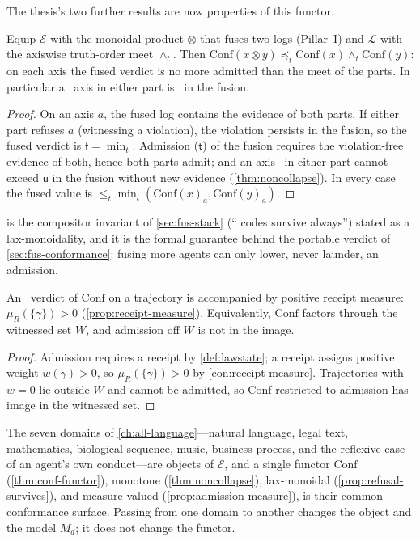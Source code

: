 The thesis's two further results are now properties of this functor.

\begin{proposition}
\label{prop:refusal-survives}
Equip $\mathcal E$ with the monoidal product $\otimes$ that fuses two logs
(Pillar~I) and $\mathcal L$ with the axiswise truth-order meet $\wedge_t$. Then
$\mathrm{Conf}(x\otimes y)\preceq_t\mathrm{Conf}(x)\wedge_t\mathrm{Conf}(y)$: on each
axis the fused verdict is no more admitted than the meet of the parts. In
particular a \ axis in either part is \ in the fusion.
\end{proposition}
\begin{proof}
On an axis $a$, the fused log contains the evidence of both parts. If either part
refuses $a$ (witnessing a violation), the violation persists in the fusion, so the
fused verdict is $\mathsf f=\min_t$. Admission ($\mathsf t$) of the fusion requires
the violation-free evidence of both, hence both parts admit; and an axis
\unknownstat\ in either part cannot exceed $\mathsf u$ in the fusion without new
evidence (\cref{thm:noncollapse}). In every case the fused value is
$\le_t\min_t(\mathrm{Conf}(x)_a,\mathrm{Conf}(y)_a)$.
\end{proof}

 is the compositor invariant of \cref{sec:fus-stack}
(`` codes survive always'') stated as a lax-monoidality, and
it is the formal guarantee behind the portable verdict of
\cref{sec:fus-conformance}: fusing more agents can only lower, never launder, an
admission.

\begin{proposition}
\label{prop:admission-measure}
An \admitted\ verdict of $\mathrm{Conf}$ on a trajectory is accompanied by positive
receipt measure: $\mu_R(\{\gamma\})>0$ (\cref{prop:receipt-measure}). Equivalently,
$\mathrm{Conf}$ factors through the witnessed set $W$, and admission off $W$ is not
in the image.
\end{proposition}
\begin{proof}
Admission requires a receipt by \cref{def:lawstate}; a receipt assigns positive
weight $w(\gamma)>0$, so $\mu_R(\{\gamma\})>0$ by \cref{con:receipt-measure}.
Trajectories with $w=0$ lie outside $W$ and cannot be admitted, so $\mathrm{Conf}$
restricted to admission has image in the witnessed set.
\end{proof}

\begin{corollary}
\label{cor:one-functor}
The seven domains of \cref{ch:all-language}---natural language, legal text,
mathematics, biological sequence, music, business process, and the reflexive case
of an agent's own conduct---are objects of $\mathcal E$, and a single functor
$\mathrm{Conf}$ (\cref{thm:conf-functor}), monotone (\cref{thm:noncollapse}),
lax-monoidal (\cref{prop:refusal-survives}), and measure-valued
(\cref{prop:admission-measure}), is their common conformance surface. Passing from
one domain to another changes the object and the model $M_d$; it does not change the
functor.
\end{corollary}

